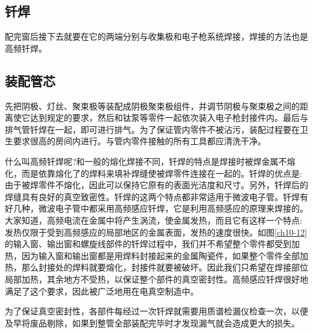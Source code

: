 \subsection{钎焊}
配完窗后接下去就要在它的两端分别与收集极和电子枪系统焊接，焊接的方法也是高频钎焊。


\subsection{装配管芯}
先把阴极、灯丝、聚束极等装配成阴极聚束极组件，并调节阴极与聚束极之间的距离使它达到规定的要求，然后和钛泵等零件一起依次装入电子枪封接件内。最后与排气管钎焊在一起，即可进行排气。为了保证管内零件不被沾污，装配过程要在卫生要求很高的房间内进行。与管内零件接触的所有工具都应清洗干净。


什么叫高频钎焊呢?和一般的熔化焊接不同，钎焊的特点是焊接时被焊金属不熔化，而是依靠熔化了的焊料来填补焊缝使被焊零件连接在一起的。钎焊的优点是:由于被焊零件不熔化，因此可以保持它原有的表面光洁度和尺寸。另外，钎焊后的焊缝具有良好的真空致密性。钎焊的这两个特点都非常适用于微波电子管。钎焊有好几种，微波电子管中都采用高频感应钎焊，它是利用高频感应的原理来焊接的。大家知道，高频电流在金属中将产生涡流，使金属发热，而且它有这样一个特点:发热仅限于受到高频感应的局部地区的金属表面，发热的速度很快。如图\ref{ch10-12}的输入窗、输出窗和螺旋线部件的钎焊过程中，我们并不希望整个零件都受到加热，因为输入窗和输出窗都是用焊料封接起来的金属陶瓷件，如果整个零件全部加热，那么封接处的焊料就要熔化，封接件就要被破坏。因此我们只希望在焊接部位局部加热，其余地方不受热，以保证整个部件的真空密封性。高频感应钎焊很好地满足了这个要求，因此被广泛地用在电真空制造中。


为了保证真空密封性，各部件每经过一次钎焊就需要用质谱检漏仪检查一次，以便及早将废品剔除，如果到整管全部装配完毕时才发现漏气就会造成更大的损失。
